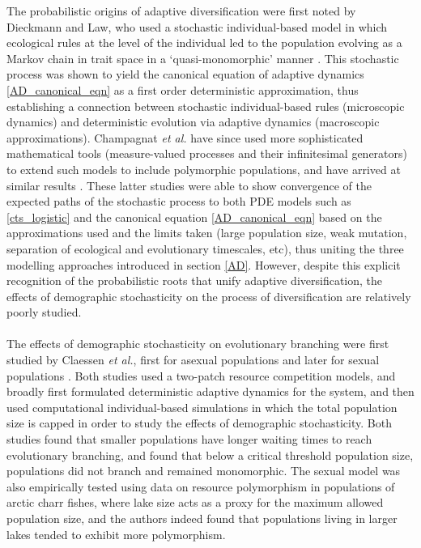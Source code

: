 The probabilistic origins of adaptive diversification were first noted by Dieckmann and Law, who used a stochastic individual-based model in which ecological rules at the level of the individual led to the population evolving as a Markov chain in trait space in a `quasi-monomorphic' manner \citep{dieckmann_dynamical_1996}. This stochastic process was shown to yield the canonical equation of adaptive dynamics \eqref{AD_canonical_eqn} as a first order deterministic approximation, thus establishing a connection between stochastic individual-based rules (microscopic dynamics) and deterministic evolution via adaptive dynamics (macroscopic approximations). Champagnat \textit{et al.} have since used more sophisticated mathematical tools (measure-valued processes and their infinitesimal generators) to extend such models to include polymorphic populations, and have arrived at similar results \citep{champagnat_unifying_2006,champagnat_individual_2008}. These latter studies were able to show convergence of the expected paths of the stochastic process to both PDE models such as \eqref{cts_logistic} and the canonical equation \eqref{AD_canonical_eqn} based on the approximations used and the limits taken (large population size, weak mutation, separation of ecological and evolutionary timescales, etc), thus uniting the three modelling approaches introduced in section \ref{AD}. However, despite this explicit recognition of the probabilistic roots that unify adaptive diversification, the effects of demographic stochasticity on the process of diversification are relatively poorly studied.\\
\\
The effects of demographic stochasticity on evolutionary branching were first studied by Claessen \textit{et al.}, first for asexual populations \citep{claessen_delayed_2007} and later for sexual populations \citep{claessen_effect_2008}. Both studies used a two-patch resource competition models, and broadly first formulated deterministic adaptive dynamics for the system, and then used computational individual-based simulations in which the total population size is capped in order to study the effects of demographic stochasticity. Both studies found that smaller populations have longer waiting times to reach evolutionary branching, and found that below a critical threshold population size, populations did not branch and remained monomorphic. The sexual model \citep{claessen_effect_2008} was also empirically tested using data on resource polymorphism in populations of arctic charr fishes, where lake size acts as a proxy for the maximum allowed population size, and the authors indeed found that populations living in larger lakes tended to exhibit more polymorphism.\\

